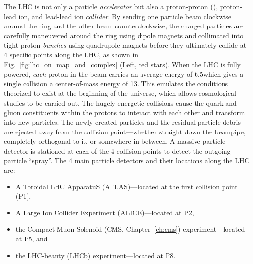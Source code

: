 The LHC is not only a particle \emph{accelerator} but also a proton-proton (\pp), proton-lead ion, and lead-lead ion \emph{collider}.
By sending one particle beam clockwise around the ring and the other beam counterclockwise, the charged particles are carefully maneuvered around the ring using dipole magnets and collimated into tight proton \emph{bunches} using quadrupole magnets before they ultimately collide at 4 specific points along the LHC, as shown in Fig.~\ref{fig:lhc_on_map_and_complex} (Left, red stars).
When the LHC is fully powered, \emph{each} proton in the beam carries an average energy of 6.5\TeV which gives a single \pp collision a center-of-mass energy of 13\TeV.
This emulates the conditions theorized to exist at the beginning of the universe, which allows cosmological studies to be carried out.
The hugely energetic \pp collisions cause the quark and gluon constituents within the protons to interact with each other and transform into new particles.
The newly created particles and the residual particle debris are ejected away from the collision point---whether straight down the beampipe, completely orthogonal to it, or somewhere in between.
A massive particle detector is stationed at each of the 4 collision points to detect the outgoing particle ``spray''.
The 4 main particle detectors and their locations along the LHC are:
\begin{itemize}
    \item A Toroidal LHC ApparatuS (ATLAS)---located at the first collision point (P1),
    \item A Large Ion Collider Experiment (ALICE)---located at P2,
    \item the Compact Muon Solenoid (CMS, Chapter~\ref{ch:cms}) experiment---located at P5, and
    \item the LHC-beauty (LHCb) experiment---located at P8.
\end{itemize}


